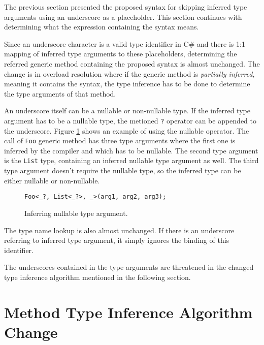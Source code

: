 The previous section presented the proposed syntax for skipping inferred type arguments using an underscore as a placeholder. 
This section continues with determining what the expression containing the syntax means.
\par
Since an underscore character is a valid type identifier in C\# and there is
1:1 mapping of inferred type arguments to these placeholders, determining the referred generic method containing the proposed syntax is almost unchanged. 
The change is in overload resolution where if the generic method is \textit{partially inferred}, meaning it contains the syntax, the type inference has to be done to determine the type arguments of that method.
\par
An underscore itself can be a nullable or non-nullable type. 
If the inferred type argument has to be a nullable type, the metioned \texttt{?} operator can be appended to the underscore. 
Figure \ref{img53:null} shows an example of using the nullable operator. 
The call of \texttt{Foo} generic method has three type arguments where the first one is inferred by the compiler and which has to be nullable. 
The second type argument is the \texttt{List} type, containing an inferred nullable type argument as well. 
The third type argument doesn’t require the nullable type, so the inferred type can be either nullable or non-nullable.
\begin{figure}[h!]
\begin{lstlisting}[style=csharp]
Foo<_?, List<_?>, _>(arg1, arg2, arg3);
\end{lstlisting}
\caption{Inferring nullable type argument.}
\label{img53:null}
\end{figure}
\par
The type name lookup is also almost unchanged. 
If there is an underscore
referring to inferred type argument, it simply ignores the binding of this identifier.
\par
The underscores contained in the type arguments are threatened in the changed type inference algorithm mentioned in the following section.

\section{Method Type Inference Algorithm Change}

